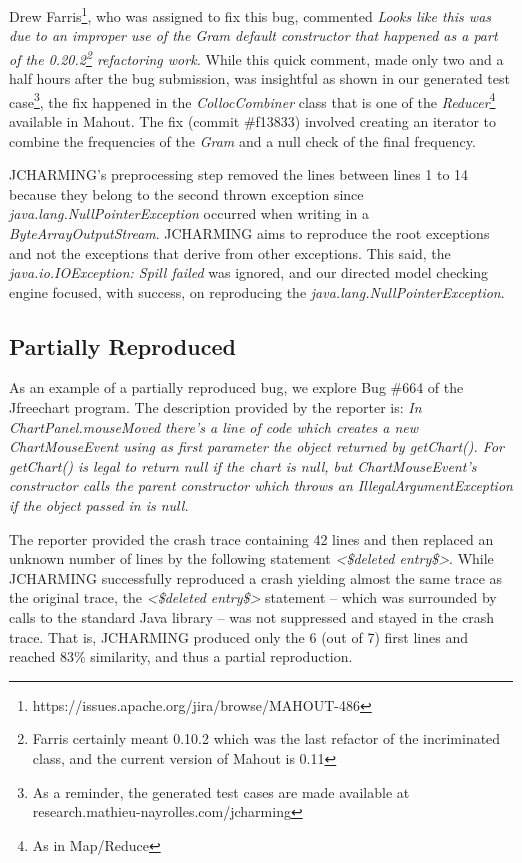 \documentclass[12pt]{report}
\begin{document}
Drew Farris\footnote{https://issues.apache.org/jira/browse/MAHOUT-486},
who was assigned to fix this bug, commented \emph{Looks like this was
due to an improper use of the Gram default constructor that happened as
a part of the
0.20.2\footnote{Farris certainly meant 0.10.2 which was the last refactor of the incriminated class, and the current version of Mahout is 0.11}
refactoring work.} While this quick comment, made only two and a half
hours after the bug submission, was insightful as shown in our generated
test
case\footnote{As a reminder, the generated test cases are made available at research.mathieu-nayrolles.com/jcharming},
the fix happened in the \emph{CollocCombiner} class that is one of the
\emph{Reducer}\footnote{As in Map/Reduce} available in Mahout. The fix
(commit \#f13833) involved creating an iterator to combine the
frequencies of the \emph{Gram} and a null check of the final frequency.

JCHARMING's preprocessing step removed the lines between lines 1 to 14
because they belong to the second thrown exception since
\emph{java.lang.NullPointerException} occurred when writing in a
\emph{ByteArrayOutputStream}. JCHARMING aims to reproduce the root
exceptions and not the exceptions that derive from other exceptions.
This said, the \emph{java.io.IOException: Spill failed} was ignored, and
our directed model checking engine focused, with success, on reproducing
the \emph{java.lang.NullPointerException}.

\subsection{Partially Reproduced}\label{partially-reproduced}

As an example of a partially reproduced bug, we explore Bug \#664 of the
Jfreechart program. The description provided by the reporter is:
\emph{In ChartPanel.mouseMoved there's a line of code which creates a
new ChartMouseEvent using as first parameter the object returned by
getChart(). For getChart() is legal to return null if the chart is null,
but ChartMouseEvent's constructor calls the parent constructor which
throws an IllegalArgumentException if the object passed in is null.}

The reporter provided the crash trace containing 42 lines and then
replaced an unknown number of lines by the following statement
\emph{\textless{}\$deleted entry\$\textgreater{}}. While JCHARMING
successfully reproduced a crash yielding almost the same trace as the
original trace, the \emph{\textless{}\$deleted entry\$\textgreater{}}
statement -- which was surrounded by calls to the standard Java library
-- was not suppressed and stayed in the crash trace. That is, JCHARMING
produced only the 6 (out of 7) first lines and reached 83\% similarity,
and thus a partial reproduction.
\end{document}
